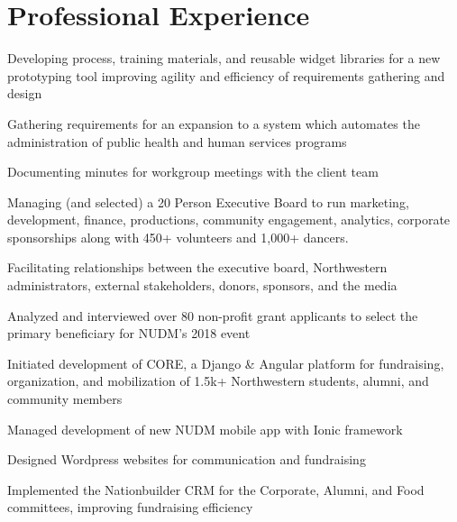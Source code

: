 
\section{Professional Experience}

\vspace{\topsep}
\begin{listitems}
\item Developing process, training materials, and reusable widget libraries for a new prototyping tool improving agility and efficiency of requirements gathering and design
\item Gathering requirements for an expansion to a system which automates the administration of public health and human services programs
\item Documenting minutes for workgroup meetings with the client team
\end{listitems}
\sectionsep

\begin{listitems}
\item Managing (and selected) a 20 Person Executive Board to run marketing, development, finance, productions, community engagement, analytics, corporate sponsorships along with 450+ volunteers and 1,000+ dancers.
\item Facilitating relationships between the executive board, Northwestern administrators, external stakeholders, donors, sponsors, and the media
\item Analyzed and interviewed over 80 non-profit grant applicants to select the primary beneficiary for NUDM's 2018 event
\end{listitems}
\begin{listitems}
\item Initiated development of CORE, a Django \& Angular platform for fundraising, organization, and mobilization of 1.5k+ Northwestern students, alumni, and community members
\item Managed development of new NUDM mobile app with Ionic framework
\item Designed Wordpress websites for communication and fundraising
\item Implemented the Nationbuilder CRM for the Corporate, Alumni, and Food committees, improving fundraising efficiency
\end{listitems}
\sectionsep

